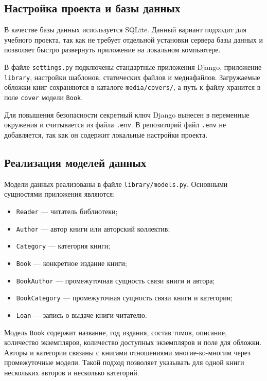 \subsection{Настройка проекта и базы данных}

В качестве базы данных используется SQLite. Данный вариант подходит для учебного проекта, так как не требует отдельной установки сервера базы данных и позволяет быстро развернуть приложение на локальном компьютере.

В файле \texttt{settings.py} подключены стандартные приложения Django, приложение \texttt{library}, настройки шаблонов, статических файлов и медиафайлов. Загружаемые обложки книг сохраняются в каталоге \texttt{media/covers/}, а путь к файлу хранится в поле \texttt{cover} модели \texttt{Book}.

Для повышения безопасности секретный ключ Django вынесен в переменные окружения и считывается из файла \texttt{.env}. В репозиторий файл \texttt{.env} не добавляется, так как он содержит локальные настройки проекта.

\subsection{Реализация моделей данных}

Модели данных реализованы в файле \texttt{library/models.py}. Основными сущностями приложения являются:

\begin{itemize}
    \item \texttt{Reader} --- читатель библиотеки;
    \item \texttt{Author} --- автор книги или авторский коллектив;
    \item \texttt{Category} --- категория книги;
    \item \texttt{Book} --- конкретное издание книги;
    \item \texttt{BookAuthor} --- промежуточная сущность связи книги и автора;
    \item \texttt{BookCategory} --- промежуточная сущность связи книги и категории;
    \item \texttt{Loan} --- запись о выдаче книги читателю.
\end{itemize}

Модель \texttt{Book} содержит название, год издания, состав томов, описание, количество экземпляров, количество доступных экземпляров и поле для обложки. Авторы и категории связаны с книгами отношениями многие-ко-многим через промежуточные модели. Такой подход позволяет указывать для одной книги нескольких авторов и несколько категорий.

